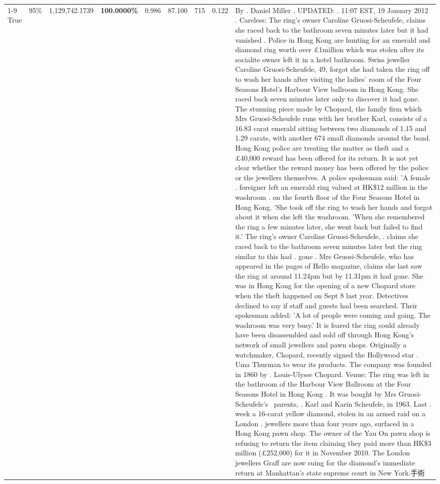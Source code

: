 \begin{table}[H]
\begin{tabular}{lllrlllll}
\cline{1-9} \cline{2-9}
True & 95\% & 1,129,742.1739 & \bfseries \color{red} 100.0000\% & 0.986 & 87.100 & 715 & 0.122 & By . Daniel Miller . UPDATED: . 11:07 EST, 19 January 2012 . Careless: The ring's owner Caroline Gruosi-Scheufele, claims she raced back to the bathroom seven minutes later but it had vanished . Police in Hong Kong are hunting for an emerald and diamond ring worth over £1million which was stolen after its socialite owner left it in a hotel bathroom. Swiss jeweller Caroline Gruosi-Scheufele, 49, forgot she had taken the ring off to wash her hands after visiting the ladies' room of the Four Seasons Hotel's Harbour View ballroom in Hong Kong. She raced back seven minutes later only to discover it had gone. The stunning piece made by Chopard, the family firm which Mrs Gruosi-Scheufele runs with her brother Karl, consists of a 16.83 carat emerald sitting between two diamonds of 1.15 and 1.29 carats, with another 674 small diamonds around the band. Hong Kong police are treating the matter as theft and a £40,000 reward has been offered for its return. It is not yet clear whether the reward money has been offered by the police or the jewellers themselves. A police spokesman said: 'A female . foreigner left an emerald ring valued at HK\$12 million in the washroom . on the fourth floor of the Four Seasons Hotel in Hong Kong. 'She took off the ring to wash her hands and forgot about it when she left the washroom. 'When she remembered the ring a few minutes later, she went back but failed to find it.' The ring's owner Caroline Gruosi-Scheufele, . claims she raced back to the bathroom seven minutes later but the ring similar to this had . gone . Mrs Gruosi-Scheufele, who has appeared in the pages of Hello magazine, claims she last saw the ring at around 11.24pm but by 11.31pm it had gone. She was in Hong Kong for the opening of a new Chopard store when the theft happened on Sept 8 last year. Detectives declined to say if staff and guests had been searched. Their spokesman added: 'A lot of people were coming and going. The washroom was very busy.' It is feared the ring could already have been disassembled and sold off through Hong Kong's network of small jewellers and pawn shops. Originally a watchmaker, Chopard, recently signed the Hollywood star . Uma Thurman to wear its products. The company was founded in 1860 by . Louis-Ulysse Chopard. Venue: The ring was left in the bathroom of the Harbour View Ballroom at the Four Seasons Hotel in Hong Kong . It was bought by Mrs Gruosi-Scheufele's  parents, . Karl and Karin Scheufele, in 1963. Last . week a 16-carat yellow diamond, stolen in an armed raid on a London . jewellers more than four years ago, surfaced in a Hong Kong pawn shop. The owner of the Yau On pawn shop is refusing to return the item claiming they paid more than HK\$3 million (£252,000) for it in November 2010. The London jewellers Graff are now suing for the diamond’s immediate return at Manhattan’s state supreme court in New York.手術 \\

\end{tabular}
\end{table}
